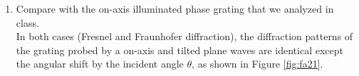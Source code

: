 \documentclass[main.tex]{subfiles}
\begin{document}
\begin{enumerate}
\begin{enumerate}
\item{Compare with the on-axis illuminated phase grating that we analyzed in class.}\\

In both cases (Fresnel and Fraunhofer diffraction), the diffraction patterns of the grating probed by a on-axis and tilted plane waves are identical except the angular shift by the incident angle $\theta$, as shown in Figure \ref{fig:fa21}.


\end{enumerate}


\end{enumerate}
\end{document}
